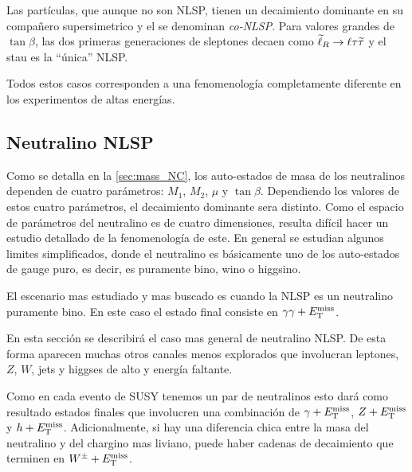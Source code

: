 Las partículas, que aunque no son NLSP, tienen un decaimiento
dominante en su compañero supersimetrico y el {\gravino} se denominan
\emph{co-NLSP}. Para valores grandes de $\tan \beta$, las dos primeras
generaciones de sleptones decaen como $\widetilde{\ell}_R \rightarrow \ell \tau
\widetilde{\tau}$ y el stau es la ``única'' NLSP.


Todos estos casos corresponden a una fenomenología completamente
diferente en los experimentos de altas energías.

\subsection{Neutralino NLSP}

Como se detalla en la \cref{sec:mass_NC}, los auto-estados de masa de
los neutralinos dependen de cuatro parámetros: $M_1$, $M_2$, $\mu$ y
$\tan\beta$. Dependiendo los valores de estos cuatro parámetros, el
decaimiento dominante sera distinto. Como el espacio de parámetros del
neutralino es de cuatro dimensiones, resulta difícil hacer un estudio
detallado de la fenomenología de este. En general se estudian algunos
limites simplificados, donde el neutralino es básicamente uno de los
auto-estados de gauge puro, es decir, es puramente bino, wino o
higgsino.

El escenario mas estudiado y mas buscado es cuando la NLSP es un
neutralino puramente bino. En este caso el estado final consiste en
$\gamma\gamma + E_{\mathrm{T}}^{\mathrm{miss}}$. 

En esta sección se describirá el caso mas general de neutralino
NLSP\cite{Ruderman:2011vv}. De esta forma aparecen muchas otros
canales menos explorados que involucran leptones, $Z$, $W$, jets y higgses
de alto {\pt} y energía faltante.

Como en cada evento de SUSY tenemos un par de neutralinos esto dará
como resultado estados finales que involucren una combinación de $\gamma
+ E_{\mathrm{T}}^{\mathrm{miss}}$, $Z + E_{\mathrm{T}}^{\mathrm{miss}}$ y $h + E_{\mathrm{T}}^{\mathrm{miss}}$. Adicionalmente, si hay una
diferencia chica entre la masa del neutralino y del chargino mas
liviano, puede haber cadenas de decaimiento que terminen en $W^\pm +
E_{\mathrm{T}}^{\mathrm{miss}}$.


